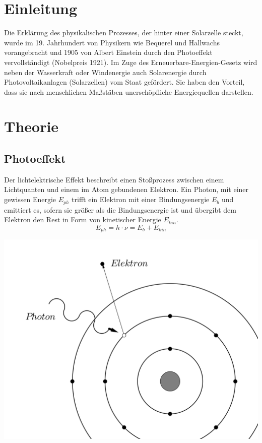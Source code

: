 
\section{Einleitung}				%
Die Erklärung des physikalischen Prozesses, der hinter einer Solarzelle steckt, wurde im 19. Jahrhundert von 
Physikern wie Bequerel und Hallwachs vorangebracht und 1905 von Albert Einstein durch den Photoeffekt vervollständigt (Nobelpreis 1921).
Im Zuge des Erneuerbare-Energien-Gesetz wird neben der Wasserkraft oder Windenergie auch Solarenergie durch Photovoltaikanlagen 
(Solarzellen) vom Staat  gefördert. Sie haben den Vorteil, dass sie nach menschlichen Maßstäben unerschöpfliche Energiequellen 
darstellen.


\section{Theorie}

\subsection{Photoeffekt}

\begin{minipage}[h]{0.4\textwidth}
Der lichtelektrische Effekt beschreibt einen Stoßprozess zwischen einem Lichtquanten und einem im Atom gebundenen Elektron. Ein Photon,
mit einer gewissen Energie $E_{ph}$ trifft ein Elektron mit einer Bindungsenergie $E_b$ und emittiert es, sofern sie größer als die 
Bindungsenergie ist und übergibt dem Elektron den Rest in Form von kinetischer Energie $E_{kin}$.
\begin{equation}
 E_{ph} = h \cdot \nu = E_{b} + E_{kin}
\end{equation}
\end{minipage}
\begin{minipage}[h]{0.6\textwidth}
  \includegraphics[width=1\textwidth]{pics/sol1.png}
\end{minipage}

